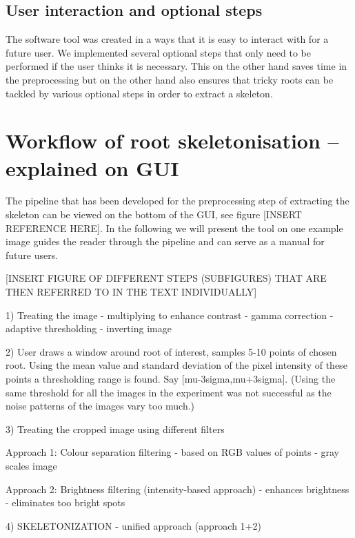 \subsection{User interaction and optional steps}
The software tool was created in a ways that it is easy to interact with for a future user. 
We implemented several optional steps that only need to be performed if the user thinks it is necessary. This on the other hand saves time in the preprocessing but on the other hand also ensures that tricky roots can be tackled by various optional steps in order to extract a skeleton. 


\section{Workflow of root skeletonisation -- explained on GUI}

The pipeline that has been developed for the preprocessing step of extracting the skeleton can be viewed on the bottom of the GUI, see figure [INSERT REFERENCE HERE].
In the following we will present the tool on one example image guides the reader through the pipeline and can serve as a manual for future users.

[INSERT FIGURE OF DIFFERENT STEPS (SUBFIGURES) THAT ARE THEN REFERRED TO IN THE TEXT INDIVIDUALLY]



1) Treating the image 
- multiplying to enhance contrast
- gamma correction
- adaptive thresholding
- inverting image

2) User draws a window around root of interest, samples 5-10 points of chosen root.
Using the mean value and standard deviation of the pixel intensity of these points a thresholding range is found. Say [mu-3sigma,mu+3sigma]. 
(Using the same threshold for all the images in the experiment was not successful as the noise patterns of the images vary too much.)


3) Treating the cropped image using different filters

Approach 1: Colour separation filtering 
- based on RGB values of points
- gray scales image

Approach 2: Brightness filtering (intensity-based approach)
- enhances brightness 
- eliminates too bright spots

4) SKELETONIZATION
- unified approach (approach 1+2)

